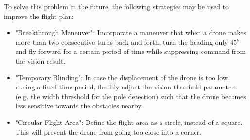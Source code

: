 To solve this problem in the future, the following strategies may be used to improve the flight plan:
\begin{itemize}
	\item "Breakthrough Maneuver": Incorporate a maneuver that when a drone makes more than two consecutive turns back and forth, turn the heading only $45^o$ and fly forward for a certain period of time while suppressing command from the vision result.
	\item "Temporary Blinding": In case the displacement of the drone is too low during a fixed time period, flexibly adjust the vision threshold parameters (e.g. the width threshold for the pole detection) such that the drone becomes less sensitive towards the obstacles nearby.
	\item "Circular Flight Area": Define the flight area as a circle, instead of a square. This will prevent the drone from going too close into a corner.
\end{itemize}

